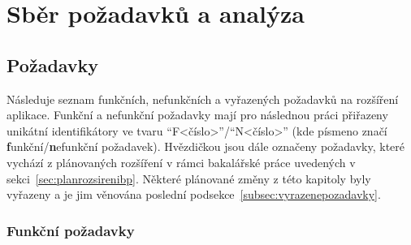 \chapter{Sběr požadavků a analýza}\label{chap:sberpozadavkuaanalyza}

\section{Požadavky}

Následuje seznam funkčních, nefunkčních a vyřazených požadavků na rozšíření aplikace. Funkční a nefunkční požadavky mají pro následnou práci přiřazeny unikátní identifikátory ve tvaru \enquote{F<číslo>}/\enquote{N<číslo>} (kde písmeno značí \textbf{f}unkční/\textbf{n}efunkční požadavek). Hvězdičkou jsou dále označeny požadavky, které vychází z plánovaných rozšíření v rámci bakalářské práce uvedených v sekci~\ref{sec:planrozsirenibp}. Některé plánované změny z této kapitoly byly vyřazeny a je jim věnována poslední podsekce~\ref{subsec:vyrazenepozadavky}.

\subsection{Funkční požadavky}

